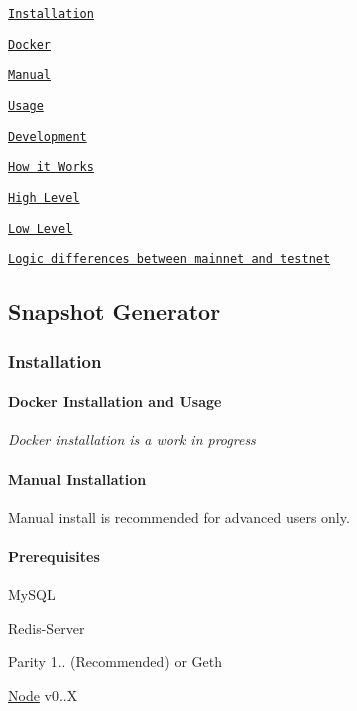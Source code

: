 
\begin{DoxyItemize}
\item \href{#installation}{\tt Installation}
\begin{DoxyItemize}
\item \href{#docker-installation-and-usage}{\tt Docker}
\item \href{#manual-installation}{\tt Manual}
\end{DoxyItemize}
\item \href{#manual-install-usage}{\tt Usage}
\item \href{#development}{\tt Development}
\item \href{#how-it-works}{\tt How it Works}
\begin{DoxyItemize}
\item \href{#high-level}{\tt High Level}
\item \href{#low-level}{\tt Low Level}
\end{DoxyItemize}
\item \href{#difference-between-testnet-and-mainnet}{\tt Logic differences between mainnet and testnet}
\end{DoxyItemize}

\subsection*{Snapshot Generator}

\subsubsection*{Installation}

\paragraph*{Docker Installation and Usage}

{\itshape Docker installation is a work in progress}

\paragraph*{Manual Installation}

Manual install is recommended for advanced users only.

\paragraph*{Prerequisites}


\begin{DoxyEnumerate}
\item My\+S\+QL
\item Redis-\/\+Server
\item Parity 1.. (Recommended) or Geth
\item \mbox{\hyperlink{struct_node}{Node}} v0..\+X
\end{DoxyEnumerate}

